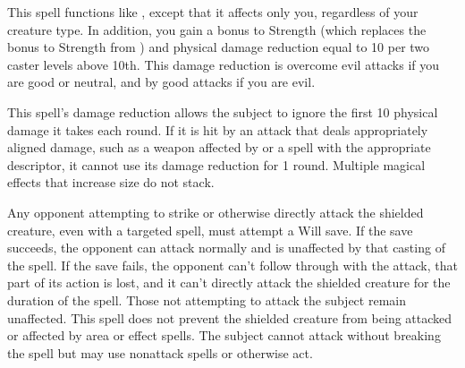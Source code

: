 \begin{spelleffect}
  This spell functions like , except that it affects only you, regardless of your creature type. In addition, you gain a  bonus to Strength (which replaces the bonus to Strength from ) and physical damage reduction equal to 10  per two caster levels above 10th. This damage reduction is overcome evil attacks if you are good or neutral, and by good attacks if you are evil.
\end{spelleffect}
\begin{spellnotes}
  This spell's damage reduction allows the subject to ignore the first 10 physical damage it takes each round. If it is hit by an attack that deals appropriately aligned damage, such as a weapon affected by  or a spell with the appropriate descriptor, it cannot use its damage reduction for 1 round.
  Multiple magical effects that increase size do not stack.
\end{spellnotes}

\spelldur{\durshort}
\begin{spelleffect}
  Any opponent attempting to strike or otherwise directly attack the shielded creature, even with a targeted spell, must attempt a Will save. If the save succeeds, the opponent can attack normally and is unaffected by that casting of the spell. If the save fails, the opponent can't follow through with the attack, that part of its action is lost, and it can't directly attack the shielded creature for the duration of the spell. Those not attempting to attack the subject remain unaffected. This spell does not prevent the shielded creature from being attacked or affected by area or effect spells. The subject cannot attack without breaking the spell but may use nonattack spells or otherwise act.
\end{spelleffect}

\begin{comment}
\subsubsection{S}
\end{comment}

